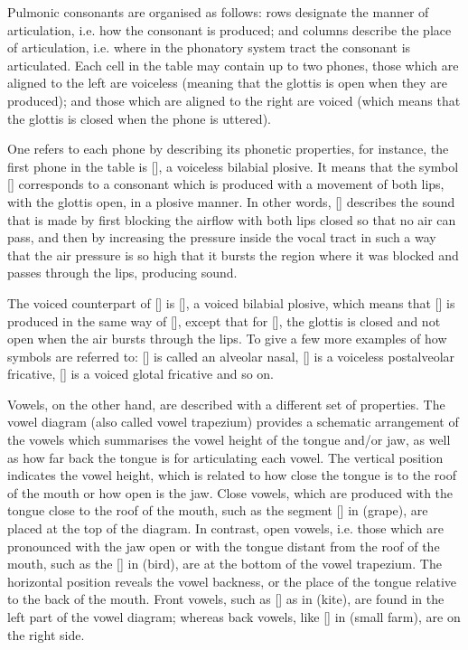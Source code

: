 Pulmonic consonants are organised as follows: rows designate the manner of articulation, i.e. how the consonant is produced; and columns describe the place of articulation, i.e. where in the phonatory system tract the consonant is articulated. Each cell in the table may contain up to two phones, those which are aligned to the left are voiceless (meaning that the glottis is open when they are produced); and those which are aligned to the right are voiced (which means that the glottis is closed when the phone is uttered). 

One refers to each phone by describing its phonetic properties, for instance, the first phone in the table is [], a voiceless bilabial plosive. It means that the symbol [] corresponds to a consonant which is produced with a movement of both lips, with the glottis open, in a plosive manner. In other words, [] describes the sound that is made by first blocking the airflow with both lips closed so that no air can pass, and then by increasing the pressure inside the vocal tract in such a way that the air pressure is so high that it bursts the region where it was blocked and passes through the lips, producing sound.

The voiced counterpart of [] is [], a voiced bilabial plosive, which means that [] is produced in the same way of [], except that for [], the glottis is closed and not open when the air bursts through the lips. To give a few more examples of how symbols are referred to: [] is called an alveolar nasal, [] is a voiceless postalveolar fricative, [] is a voiced glotal fricative and so on.

Vowels, on the other hand, are described with a different set of properties. The vowel diagram (also called vowel trapezium) provides a schematic arrangement of the vowels which summarises the vowel height of the tongue and/or jaw, as well as how far back the tongue is for articulating each vowel. The vertical position indicates the vowel height, which is related to how close the tongue is to the roof of the mouth or how open is the jaw. Close vowels, which are produced with the tongue close to the roof of the mouth, such as the segment [] in  (grape), are placed at the top of the diagram. In contrast, open vowels, i.e. those which are pronounced with the jaw open or with the tongue distant from the roof of the mouth, such as the [] in  (bird), are at the bottom of the vowel trapezium. The horizontal position reveals the vowel backness, or the place of the tongue relative to the back of the mouth. Front vowels, such as [] as in  (kite), are found in the left part of the vowel diagram; whereas back vowels, like [] in  (small farm), are on the right side.

